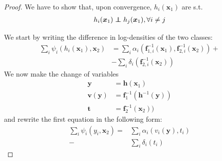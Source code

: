 \documentclass[letterpaper]{article}
\newcommand\independent{\protect\mathpalette{\protect\independenT}{\perp}}
\def\independenT#1#2{\mathrel{\rlap{$#1#2$}\mkern2mu{#1#2}}}
\theoremstyle{definition}
\begin{document}
\begin{proof}
We have to
show that, upon convergence, $h_{i}(\bm{x}_{1})$ are s.t.
\begin{align*}
h_{i}(\bm{x}_{1})\independent h_{j}(\bm{x}_{1}),\forall i\neq j
\end{align*}

We start by writing the difference in log-densities of the two classes:
\begin{align*}
\sum_{i}\psi_{i}(h_{i}(\bm{x}_{1}),\bm{x}_{2})  &=\sum_{i}\alpha_{i}(\bm{f}_{1,i}^{-1}(\bm{x}_{1}), \bm{f}_{2,i}^{-1}(\bm{x}_{2}))+\\
&-\sum_{i}\delta_{i}( \bm{f}_{2,i}^{-1}(\bm{x}_{2}))
\end{align*}
We now make the change of variables
\begin{align*}
\bm{y} & =\bm{h}(\bm{x}_{1})\\
\bm{v}(\bm{y}) & =\bm{f}_{1}^{-1}(\bm{h}^{-1}(\bm{y}))\\
\bm{t} & = \bm{f}_{2}^{-1}(\bm{x}_{2}))
\end{align*}
and rewrite the first equation in the following form:
\begin{align}
\sum_{i}\psi_{i}(y_{i},\bm{x}_{2})=&\sum_{i}\alpha_{i}(v_{i}(\bm{y}), t_{i})\\
-&\sum_{i}\delta_{i}( t_{i})
\end{align}


\end{proof}
\end{document}
